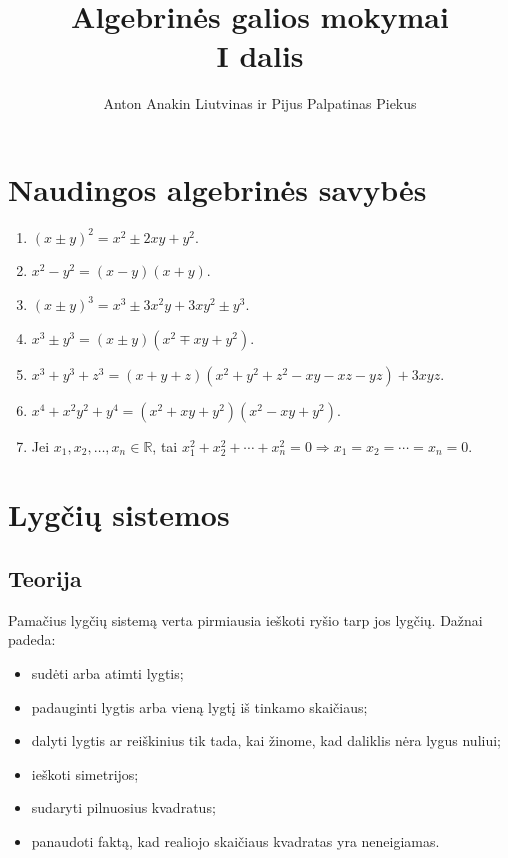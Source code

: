 \documentclass[11pt,a4paper]{scrartcl}
\title{Algebrinės galios mokymai\\ I dalis}
\author{Anton Anakin Liutvinas ir Pijus Palpatinas Piekus}
\begin{document}
\maketitle

\section{Naudingos algebrinės savybės}

\begin{enumerate}
    \renewcommand{\labelenumi}{\textbf{\theenumi.}}

    \item $(x\pm y)^2=x^2\pm 2xy+y^2$.
    \item $x^2-y^2=(x-y)(x+y)$.
    \item $(x\pm y)^3=x^3\pm 3x^2y+3xy^2\pm y^3$.
    \item $x^3\pm y^3=(x\pm y)(x^2\mp xy+y^2)$.
    \item $x^3+y^3+z^3=(x+y+z)(x^2+y^2+z^2-xy-xz-yz)+3xyz$.
    \item $x^4+x^2y^2+y^4=(x^2+xy+y^2)(x^2-xy+y^2)$.
    \item Jei $x_1,x_2,\ldots,x_n\in\mathbb R$, tai $x_1^2+x_2^2+\cdots+x_n^2=0\Longrightarrow x_1=x_2=\cdots=x_n=0$.
\end{enumerate}


\section{Lygčių sistemos}

\subsection{Teorija}

Pamačius lygčių sistemą verta pirmiausia ieškoti ryšio tarp jos lygčių.
Dažnai padeda:

\begin{itemize}
    \item sudėti arba atimti lygtis;
    \item padauginti lygtis arba vieną lygtį iš tinkamo skaičiaus;
    \item dalyti lygtis ar reiškinius tik tada, kai žinome, kad daliklis nėra lygus nuliui;
    \item ieškoti simetrijos;
    \item sudaryti pilnuosius kvadratus;
    \item panaudoti faktą, kad realiojo skaičiaus kvadratas yra neneigiamas.
\end{itemize}
\end{document}
